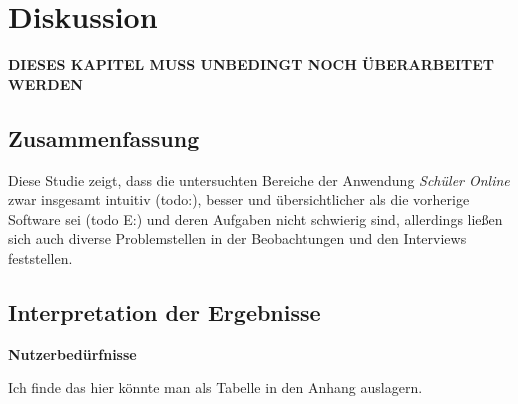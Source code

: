 \section{Diskussion}

\textbf{DIESES KAPITEL MUSS UNBEDINGT NOCH ÜBERARBEITET WERDEN}

\subsection{Zusammenfassung}
Diese Studie zeigt, dass die untersuchten Bereiche der Anwendung \textit{Schüler Online} zwar insgesamt intuitiv (todo:), besser und übersichtlicher als die vorherige Software sei (todo E:) und deren Aufgaben nicht schwierig sind, allerdings ließen sich auch diverse Problemstellen in der Beobachtungen und den Interviews feststellen. 

%

\subsection{Interpretation der Ergebnisse}

\textbf{Nutzerbedürfnisse}

Ich finde das hier könnte man als Tabelle in den Anhang auslagern.

